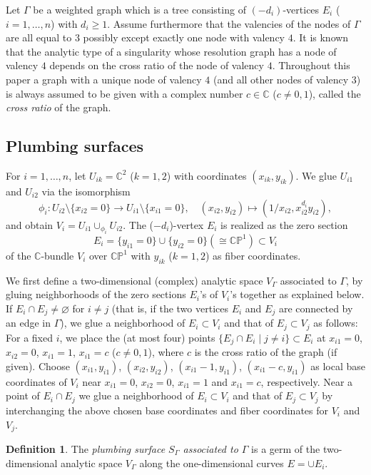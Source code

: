 \documentclass[a4paper, reqno, twoside]{amsart}
\theoremstyle{definition}
\newtheorem{definition}[theorem]{Definition}
\numberwithin{equation}{section}
\begin{document}
Let $\Gamma$ be a weighted graph which is a tree consisting of
$(-d_i)$-vertices $E_i$ ($i=1,\dotsc,n$) with $d_i \ge 1$. Assume furthermore
that the valencies of the nodes of $\Gamma$ are all equal to $3$ possibly
except exactly one node with valency $4$.  It is known that the analytic type
of a singularity whose resolution graph has a node of valency $4$ depends on
the cross ratio of the node of valency $4$. Throughout this paper a
graph with a unique node of valency $4$ (and all other nodes of valency $3$)
is always assumed to be given with a complex number $c \in \mathbb{C}$ ($c
\neq 0, 1$), called the \emph{cross ratio} of the graph.

\subsection{Plumbing surfaces}

For $i=1, \dotsc, n$, let $U_{ik} = \mathbb{C}^2$ ($k=1,2$) with
coordinates $(x_{ik}, y_{ik})$. We glue $U_{i1}$ and $U_{i2}$ via the
isomorphism
\[\phi_i\colon U_{i2} \setminus \{x_{i2}=0\} \to U_{i1} \setminus \{x_{i1}=0\}, \quad (x_{i2}, y_{i2}) \mapsto (1/x_{i2}, x_{i2}^{d_i} y_{i2}),\]
and obtain $V_i = U_{i1} \cup_{\phi_i} U_{i2}$. The
($-d_i$)-vertex $E_i$ is realized as the zero section
\[E_i = \{y_{i1}=0\} \cup \{y_{i2}=0\} (\cong \mathbb{CP}^1) \subset V_i\]
of the $\mathbb{C}$-bundle $V_i$ over $\mathbb{CP}^1$ with $y_{ik}$
($k=1,2$) as fiber coordinates.

We first define a two-dimensional (complex) analytic space
$V_{\Gamma}$ associated to $\Gamma$, by gluing neighborhoods of the
zero sections $E_i$'s of $V_i$'s together as explained below. If $E_i
\cap E_j \neq \varnothing$ for $i \neq j$ (that is, if the two
vertices $E_i$ and $E_j$ are connected by an edge in $\Gamma$), we
glue a neighborhood of $E_i \subset V_i$ and that of $E_j \subset V_j$
as follows: For a fixed $i$, we place the (at most four) points $\{E_j
\cap E_i \mid j \neq i \} \subset E_i$ at $x_{i1}=0$, $x_{i2}=0$,
$x_{i1}=1$, $x_{i1}=c$ ($c \neq 0, 1$), where $c$ is the cross ratio
of the graph (if given). Choose $(x_{i1}, y_{i1})$, $(x_{i2},
y_{i2})$, $(x_{i1}-1, y_{i1})$, $(x_{i1}-c, y_{i1})$ as local base
coordinates of $V_i$ near $x_{i1}=0$, $x_{i2}=0$, $x_{i1}=1$ and
$x_{i1}=c$, respectively. Near a point of $E_i \cap E_j$ we glue a
neighborhood of $E_i \subset V_i$ and that of $E_j \subset V_j$ by
interchanging the above chosen base coordinates and fiber coordinates
for $V_i$ and $V_j$.

\begin{definition}
  The \emph{plumbing surface $S_{\Gamma}$ associated to $\Gamma$} is a germ of
  the two-dimensional analytic space $V_{\Gamma}$ along the one-dimensional
  curves $E=\cup E_i$.
\end{definition}
\end{document}
